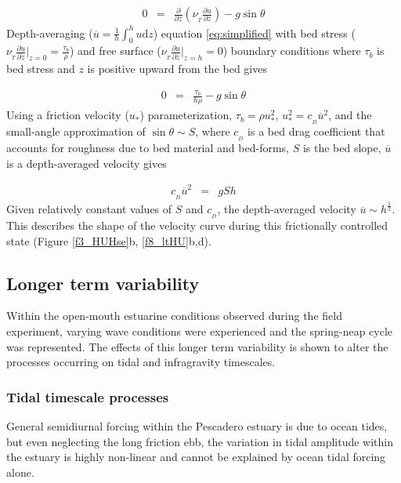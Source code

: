 \begin{eqnarray}
0 & = & \frac{\partial}{\partial z}\left(\nu_{_{T}}\frac{\partial u}{\partial z}\right)-g\sin\theta\label{eq:simplified}
\end{eqnarray}
Depth-averaging ($\overline{u}=\frac{1}{h}\int_{0}^{h}u\mathrm{d}z$)
equation \ref{eq:simplified} with bed stress ($\nu_{_{T}}\frac{\partial u}{\partial z}\Bigr|_{z=0}=\frac{\tau_{b}}{\rho}$)
and free surface ($\nu_{_{T}}\frac{\partial u}{\partial z}\Bigr|_{z=h}=0$)
boundary conditions where $\tau_{b}$ is bed stress and $z$ is positive
upward from the bed gives

\begin{eqnarray}
0 & = & \frac{\tau_{b}}{h\rho}-g\sin\theta\label{eq:fc_w_taubed}
\end{eqnarray}
Using a friction velocity ($u_{*}$) parameterization, $\tau_{b}=\rho u_{*}^{2}$,
$u_{*}^{2}=c_{_D}\overline{u}^{2}$, and the small-angle approximation
of $\sin\theta\sim S$, where $c_{_D}$ is a bed drag coefficient that
accounts for roughness due to bed material and bed-forms, $S$ is
the bed slope, $\overline{u}$ is a depth-averaged velocity gives

\begin{eqnarray}
c_{_D}\overline{u}^{2} & = & gSh\label{eq:frictionalcontrol}
\end{eqnarray}
 Given relatively constant values of $S$ and $c_{_D}$, the depth-averaged
velocity $\overline{u}\sim h^{\frac{1}{2}}$. This describes the shape
of the velocity curve during this frictionally controlled state (Figure
\ref{f3_HUHse}b, \ref{f8_ltHU}b,d).


\subsection{Longer term variability}

Within the open-mouth estuarine conditions observed during the field
experiment, varying wave conditions were experienced and the spring-neap
cycle was represented. The effects of this longer term variability
is shown to alter the processes occurring on tidal and infragravity
timescales. 


\subsubsection{Tidal timescale processes}

General semidiurnal forcing within the Pescadero estuary is due to
ocean tides, but even neglecting the long friction ebb, the variation
in tidal amplitude within the estuary is highly non-linear and cannot
be explained by ocean tidal forcing alone. 


